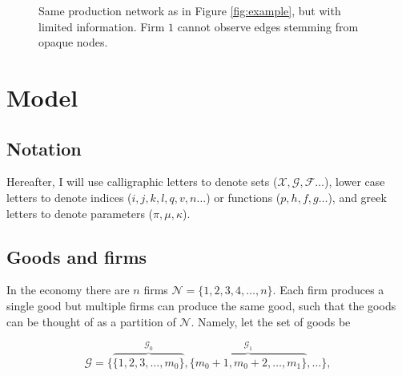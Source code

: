 \documentclass[american, abstract=on]{scrartcl}
\newcommand{\inputTikZ}[2]{%
      \scalebox{#1}{}  
    }
\newcommand{\F}{\mathcal{F}}
\newcommand{\X}{\mathcal{X}}
\newcommand{\G}{\mathcal{G}}
\newcommand{\N}{\mathcal{N}}
\newcommand{\citein}[1]{\citeauthor{#1} (\citeyear{#1})}
\newcommand\notes[1]{\textcolor{teal}{\textbf{#1}}}
\begin{document}
\begin{figure}[H]
  \centering
  \inputTikZ{0.5}{../diagrams/example-limited.tikz} 
  \caption{Same production network as in Figure \ref{fig:example}, but with limited information. Firm $1$ cannot observe edges stemming from opaque nodes.}
  \label{fig:example:unknown}  
\end{figure}

\iffalse


\section{Literature review}

The model presented here introduces insights from the literature of games on networks and learning on networks to the macroeconomic literature on endogenous production network.

Particularly relevant are the models developed by \citein{dasaratha_bayesian_2018} and \citein{dasaratha_learning_2021} where agents observe neighbours characteristics to learn about a latent network state.   

\notes{TODO: I collected the relevant papers, need to complete this section}

\fi

\section{Model}

\subsection{Notation}

Hereafter, I will use calligraphic letters to denote sets ($\X, \G, \F \ldots$), lower case letters to denote indices ($i, j, k, l, q, v, n \ldots$) or functions ($p, h, f, g \ldots$), and greek letters to denote parameters ($\pi, \mu, \kappa$).

\subsection{Goods and firms}

In the economy there are $n$ firms $\N = \{1, 2, 3, 4, \ldots, n \}$. Each firm produces a single good but multiple firms can produce the same good, such that the goods can be thought of as a partition of $\N$. Namely, let the set of goods be

\begin{equation}
    \G = \{ \overbrace{\{1, 2, 3, \ldots, m_0\}}^{\G_0},  \overbrace{\{m_0 + 1, m_0 + 2, \ldots, m_1\}}^{\G_1}, \ldots \},
\end{equation}
\end{document}
